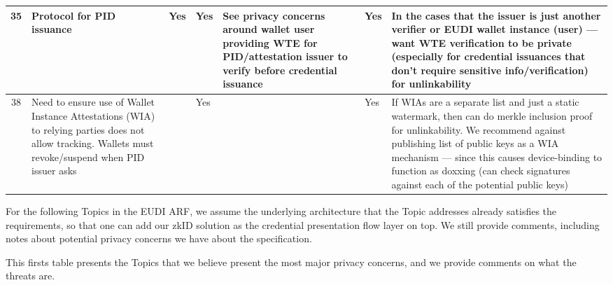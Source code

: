 \begin{longtable}{|c|p{}|p{}|p{}|p{}|p{}|p{}|}
35 & Protocol for PID issuance & Yes & Yes & See privacy concerns around wallet user providing WTE for PID/attestation issuer to verify before credential issuance & Yes & In the cases that the issuer is just another verifier or EUDI wallet instance (user) — want WTE verification to be private (especially for credential issuances that don't require sensitive info/verification) for unlinkability \\
\hline

38 & Need to ensure use of Wallet Instance Attestations (WIA) to relying parties does not allow tracking. Wallets must revoke/suspend when PID issuer asks & & Yes & & Yes & If WIAs are a separate list and just a static watermark, then can do merkle inclusion proof for unlinkability. We recommend against publishing list of public keys as a WIA mechanism — since this causes device-binding to function as doxxing (can check signatures against each of the potential public keys) \\
\hline


\hline


\end{longtable}

For the following Topics in the EUDI ARF, we assume the underlying architecture that the Topic addresses already satisfies the requirements, so that one can add our zkID solution as the credential presentation flow layer on top. We still provide comments, including notes about potential privacy concerns we have about the specification.  

This firsts table presents the Topics that we believe present the most major privacy concerns, and we provide comments on what the threats are.

